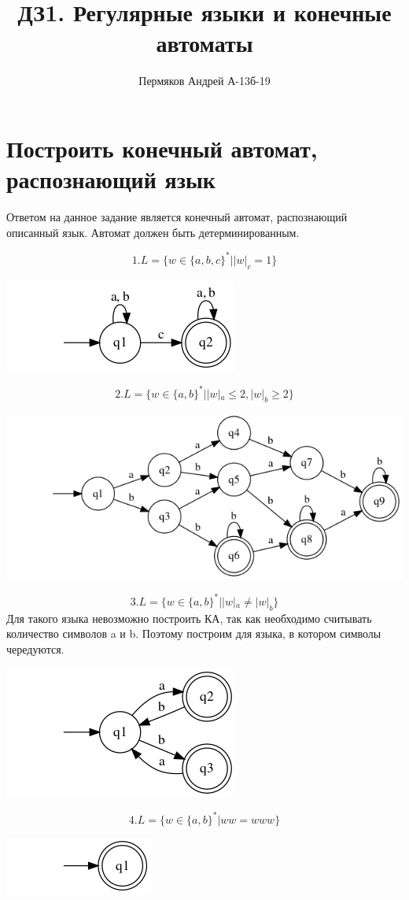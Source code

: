 \documentclass[a4paper, 12pt]{article}
\author{Пермяков Андрей А-13б-19}
\title{ДЗ1. Регулярные языки и конечные автоматы}
\date{}
\begin{document}
\maketitle

\section{Построить конечный автомат, распознающий язык}
Ответом на данное задание является конечный автомат, распознающий описанный язык. Автомат должен быть детерминированным.


$$ 1. L = \{w \in \{a,b,c\}^* | |w|_c = 1 \} $$

\begin{center}
    \includegraphics[scale=0.7]{graph1_1.png}
\end{center}

$$2. L = \{w \in \{a,b\}^* | |w|_a \leq 2, |w|_b \geq 2 \}$$

\begin{center}
    \includegraphics[scale=0.7]{graph1_2.png}
\end{center}
$$3. L = \{w \in \{a,b\}^* | |w|_a \neq |w|_b \}$$
Для такого языка невозможно построить КА, так как необходимо считывать количество символов a и b. Поэтому построим для языка, в котором символы чередуются.
\begin{center}
    \includegraphics[scale=0.7]{graph1_3.png}
\end{center}
$$4. L = \{w \in \{a,b\}^* | ww = www \}$$
\begin{center}
    \includegraphics[scale=0.7]{graph1_4.png}
\end{center}
\end{document}
